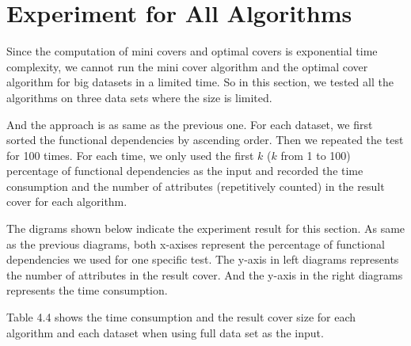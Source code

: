 \documentclass[11pt]{book}
\begin{document}
\section{Experiment for All Algorithms}

Since the computation of mini covers and optimal covers is exponential time complexity, we cannot run the mini cover algorithm and the optimal cover algorithm for big datasets in a limited time. So in this section, we tested all the algorithms on three data sets where the size is limited.

And the approach is as same as the previous one. For each dataset, we first sorted the functional dependencies by ascending order. Then we repeated the test for 100 times. For each time, we only used the first $k$ ($k$ from 1 to 100) percentage of functional dependencies as the input and recorded the time consumption and the number of attributes (repetitively counted) in the result cover for each algorithm.

The digrams shown below indicate the experiment result for this section. As same as the previous diagrams, both x-axises represent the percentage of functional dependencies we used for one specific test. The y-axis in left diagrams represents the number of attributes in the result cover. And the y-axis in the right diagrams represents the time consumption.

Table 4.4 shows the time consumption and the result cover size for each algorithm and each dataset when using full data set as the input.
\end{document}
